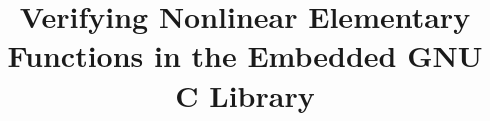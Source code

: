 \documentclass{acm_proc_article-sp}
\begin{document}
\title{Verifying Nonlinear Elementary Functions in the Embedded GNU C Library}

\maketitle
\begin{abstract}

\end{abstract}














\end{document}
